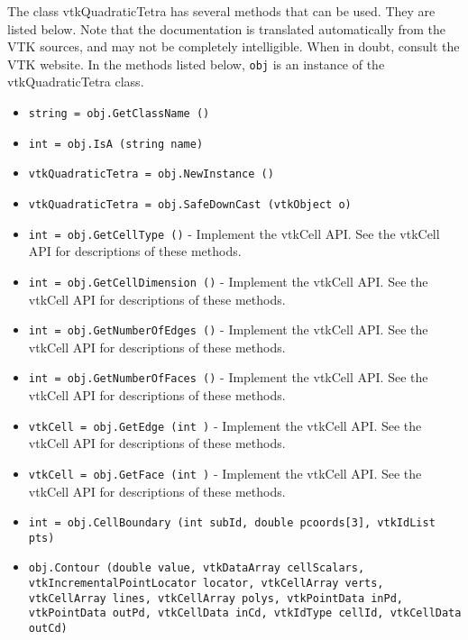 The class vtkQuadraticTetra has several methods that can be used.
  They are listed below.
Note that the documentation is translated automatically from the VTK sources,
and may not be completely intelligible.  When in doubt, consult the VTK website.
In the methods listed below, \verb|obj| is an instance of the vtkQuadraticTetra class.
\begin{itemize}
\item  \verb|string = obj.GetClassName ()|

\item  \verb|int = obj.IsA (string name)|

\item  \verb|vtkQuadraticTetra = obj.NewInstance ()|

\item  \verb|vtkQuadraticTetra = obj.SafeDownCast (vtkObject o)|

\item  \verb|int = obj.GetCellType ()| -  Implement the vtkCell API. See the vtkCell API for descriptions
 of these methods.

\item  \verb|int = obj.GetCellDimension ()| -  Implement the vtkCell API. See the vtkCell API for descriptions
 of these methods.

\item  \verb|int = obj.GetNumberOfEdges ()| -  Implement the vtkCell API. See the vtkCell API for descriptions
 of these methods.

\item  \verb|int = obj.GetNumberOfFaces ()| -  Implement the vtkCell API. See the vtkCell API for descriptions
 of these methods.

\item  \verb|vtkCell = obj.GetEdge (int )| -  Implement the vtkCell API. See the vtkCell API for descriptions
 of these methods.

\item  \verb|vtkCell = obj.GetFace (int )| -  Implement the vtkCell API. See the vtkCell API for descriptions
 of these methods.

\item  \verb|int = obj.CellBoundary (int subId, double pcoords[3], vtkIdList pts)|

\item  \verb|obj.Contour (double value, vtkDataArray cellScalars, vtkIncrementalPointLocator locator, vtkCellArray verts, vtkCellArray lines, vtkCellArray polys, vtkPointData inPd, vtkPointData outPd, vtkCellData inCd, vtkIdType cellId, vtkCellData outCd)|


\end{itemize}
